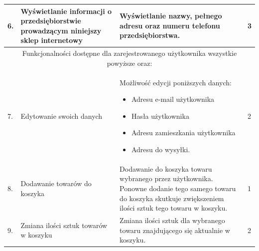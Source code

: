 \documentclass[10pt,a4paper]{article}
\begin{document}
\begin{longtable}{| m{0.5cm} | m{4cm} | p{6cm} | m{1.5cm} |}
			6. & Wyświetlanie informacji 
			     o przedsiębiorstwie prowadzącym 
			     niniejszy sklep internetowy			& Wyświetlanie nazwy, pełnego adresu 
			     										  oraz numeru telefonu przedsiębiorstwa.    & 3\\ \hline
			\multicolumn{4}{|c|}{Funkcjonalności dostępne dla zarejestrowanego użytkownika
			wszystkie powyższe oraz:}\\ \hline
			7. & Edytowanie swoich danych				& Możliwość edycji poniższych danych:
														  \begin{itemize}[label={--}]
														  \item Adresu e-mail użytkownika
														  \item Hasła użytkownika
														  \item Adresu zamieszkania użytkownika
														  \item Adresu do wysyłki.					
														  \end{itemize}								& 2\\ \hline
										  
			8. & Dodawanie towarów do koszyka 			& Dodawanie do koszyka towaru wybranego 
														  przez użytkownika. Ponowne dodanie tego
														  samego towaru do koszyka skutkuje 
														  zwiększeniem ilości sztuk 
														  tego towaru w koszyku.					& 1\\ \hline
														  
			9. & Zmiana ilości sztuk towarów w koszyku & Zmiana ilości sztuk dla wybranego towaru 
														 znajdującego się aktualnie w koszyku. 		& 2\\ \hline
														 

\end{longtable}
\end{document}
